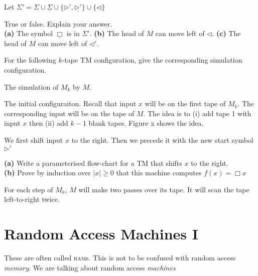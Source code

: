 \frmrule

Let $\Sigma' = \Sigma \cup \underline{\Sigma} \cup \{\triangleright', \underline{\triangleright'}\} \cup \{\triangleleft\}$

\frmrule

\begin{example}
True or false. Explain your answer.\\
\textbf{(a)} The symbol $\underline{\Box}$ is in $\Sigma'$.
\textbf{(b)} The head of $M$ can move left of $\triangleleft$.
\textbf{(c)} The head of $M$ can move left of $\triangleleft'$.
\end{example}

\begin{example}
For the following $k$-tape TM configuration, give the
corresponding simulation configuration.
\end{example}


\frmrule

The simulation of $M_k$ by $M$.

The initial configuraiton. 
Recall that input $x$ will 
be on the first tape of $M_k$. The corresponding input 
will be on the tape of $M$. The idea is to
(i) add tape 1 with input $x$
then (ii) add $k-1$ blank tapes. Figure x shows the idea.

We first shift input $x$ to the right. Then we precede it 
with the new start symbol $\triangleright'$ 

\frmrule

\begin{example}
\textbf{(a)} Write a parameterised flow-chart for a TM that shifts $x$ to the right.\\
\textbf{(b)} Prove by induction over $|x| \geqslant 0$ that this machine computes $f(x) = \Box x$
\end{example}







For each step of $M_k$, $M$ will make two passes over its tape. 
It will scan the tape left-to-right twice. 


\section{Random Access Machines I}

These are often called \textsc{ram}s. 
This is not to be confused with random access \textit{memory}.
We are talking about random access \textit{machines}